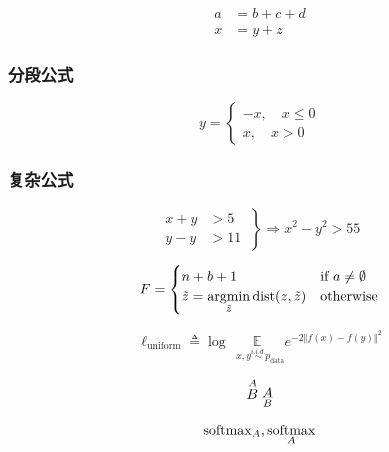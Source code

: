 \begin{align}
a &= b+c+d \\
x &= y+z
\end{align}

\subsubsection{分段公式}
\begin{equation}
    y= \begin{cases}
    -x,\quad x\leq 0 \\
    x,\quad x>0
    \end{cases} 
\end{equation}

\subsubsection{复杂公式}
\begin{equation}
\left.
\begin{aligned}
x+y &> 5 \\
y-y &> 11
\end{aligned}
\ \right\}\Rightarrow x^2 - y^2 > 55
\end{equation}

\begin{equation}
  F = 
  \begin{cases}
    n + b + 1 & \text{if $a \neq \emptyset$}\\

    \tilde{z} = \operatornamewithlimits{argmin}\limits_{\tilde{z}}\operatorname{dist}(z, \tilde{z}) & \text{otherwise}
  \end{cases}
\end{equation}

\begin{equation}
    \ell_{\mathrm{uniform}}\triangleq\log \underset{~~~x, y\stackrel{i.i.d.}{\sim} p_{\mathrm{data}}}{\mathbb{E}}   e^{-2\Vert f(x)-f(y) \Vert^2}
\end{equation}

\begin{equation}
    \stackrel{A}{B} \\ 
    \underset{B}{A}
\end{equation}

\begin{align}
    \operatorname{softmax}_A, \operatornamewithlimits{softmax}_A
\end{align}



